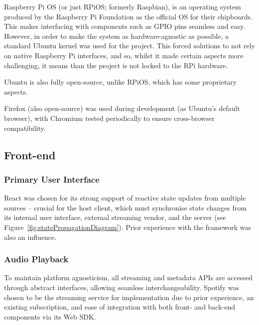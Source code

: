                 Raspberry Pi OS (or just RPiOS; formerly Raspbian), is an operating system produced by the Raspberry Pi Foundation as the official OS for their chipboards. This makes interfacing with components such as GPIO pins seamless and easy. However, in order to make the system as hardware-agnostic as possible, a standard Ubuntu kernel was used for the project. This forced solutions to not rely on native Raspberry Pi interfaces, and so, whilst it made certain aspects more challenging, it means than the project is not locked to the RPi hardware.
    
                Ubuntu is also fully open-source, unlike RPiOS, which has some proprietary aspects.
    
                Firefox (also open-source) was used during development (as Ubuntu's default browser), with Chromium tested periodically to ensure cross-browser compatibility.
                
        
        \subsection{Front-end}
            \subsubsection{Primary User Interface}
    
                React was chosen for its strong support of reactive state updates from multiple sources -- crucial for the host client, which must synchronise state changes from its internal user interface, external streaming vendor, and the server (see Figure~\ref{fig:statePropagationDiagram}). Prior experience with the framework was also an influence.
            
            \subsubsection{Audio Playback}
    
                To maintain platform agnosticism, all streaming and metadata APIs are accessed through abstract interfaces, allowing seamless interchangeability. Spotify was chosen to be the streaming service for implementation due to prior experience, an existing subscription, and ease of integration with both front- and back-end components via its Web SDK.
    
